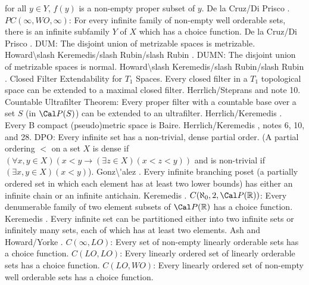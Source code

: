 for all $y\in Y$, $f(y)$ is a non-empty proper subset of $y$.
De la Cruz/Di \ac{Prisco} \cite{1998a}.
\medskip
{} $PC(\infty,WO,\infty)$:  For every infinite
family of non-empty well orderable sets, there is an infinite subfamily $Y$
of $X$ which has a choice function.  De la Cruz/Di \ac{Prisco} \cite{1998a}.
\medskip
{} DUM:  The disjoint union of metrizable spaces
is metrizable. \ac{Howard\slash Keremedis/slash Rubin/slash Rubin}
\cite{1998b}.
\medskip
{} DUMN:  The disjoint union of metrizable spaces
is normal. \ac{Howard\slash Keremedis/slash Rubin/slash Rubin} \cite{1998b}.
\medskip
\medskip
{} Closed Filter Extendability for $T_1$ Spaces.
Every closed filter in a $T_1$ topological space can be extended to a
maximal closed filter. \ac{Herrlich/Steprans} \cite{1997} and note 10.
\medskip
{} Countable Ultrafilter Theorem:  Every proper
filter with a countable base over a set $S$ (in ${\Cal P}(S)$) can
be extended to an ultrafilter. \ac{Herrlich/Keremedis} \cite{1999a}.
\medskip
{} Every B compact (pseudo)metric space is Baire.
\ac{Herrlich/Keremedis} \cite{1999a}, notes 6, 10, and 28.
\medskip
{} DPO:  Every infinite set has a non-trivial,
dense partial order.  (A partial ordering $<$ on a set $X$ is dense
if $(\forall x, y\in X)(x<y \to (\exists z\in X)(x<z<y))$ and is
non-trivial if $(\exists x,y\in X)(x < y)$).  \ac{Gonz\'alez}
\cite{1995a}.
\medskip
{} Every infinite branching poset (a partially
ordered set in which each element has at least two lower bounds) has
either an infinite chain or an infinite antichain. \ac{Keremedis}
\cite{1999a}.
\medskip
{} $C(\aleph_0,2,\Cal P({\Bbb R}))$: Every
denumerable family of two element subsets of $\Cal P({\Bbb R})$ has
a choice function.  \ac{Keremedis} \cite{1999b}.
\medskip
{} Every infinite set can be partitioned either
into two infinite sets or infinitely many sets, each of which has at
least two elements. \ac{Ash} \cite{1983} and \ac{Howard/Yorke}
\cite{1989}.
\medskip
{} $C(\infty,LO)$: Every set of non-empty
linearly orderable sets has a choice function.
\medskip
{} $C(LO,LO)$: Every linearly ordered set of
linearly orderable sets has a choice function.
\medskip
{} $C(LO,WO)$: Every linearly ordered set of
non-empty well orderable sets has a choice function.
